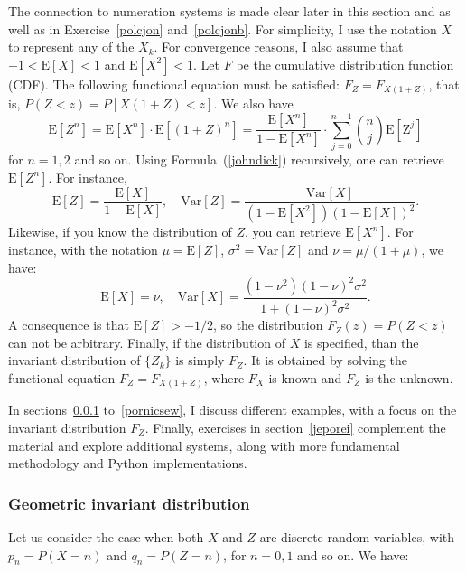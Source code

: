 \documentclass[oneside,10pt]{book}
\begin{document}
The connection to numeration systems is made clear later in this section and as well as in Exercise~\ref{polcjon} and~\ref{polcjonb}. For simplicity, I use the notation $X$ to represent any of the $X_k$. For convergence reasons, I also assume that $-1<\text{E}[X]< 1$ and $\text{E}[X^2]<1$.
Let $F$ be the cumulative distribution
 function (CDF).
The following \textcolor{index}{functional equation} must be satisfied:
$F_Z = F_{X(1+Z)}$, that is, $P(Z<z) = P[X(1+Z)<z]$. We also have
\begin{equation}
\text{E}[Z^n] =\text{E}[X^n]\cdot \text{E}[(1+Z)^n] = \frac{\text{E}[X^n]}{1-\text{E}[X^n]}
 \cdot\sum_{j=0}^{n-1} \binom{n}{j} \text{E}[\text{Z}^j] \label{johndick}
\end{equation}
 for $n=1,2$ and so on. Using Formula~(\ref{johndick}) recursively, one can retrieve
$\text{E}[Z^n]$. For instance,
$$
\text{E}[Z] = \frac{\text{E}[X]}{1-\text{E}[X]}, \quad \text{Var}[Z] = \frac{\text{Var}[X]}{(1-\text{E}[X^2])(1-\text{E}[X])^2}.
$$
Likewise, if you know the distribution of $Z$, you can retrieve $\text{E}[X^n]$. For instance,
with the notation $\mu=\text{E}[Z]$, $\sigma^2=\text{Var}[Z]$ and $\nu=\mu/(1+\mu)$, we have:
$$
\text{E}[X] = \nu, \quad \text{Var}[X] = \frac{(1-\nu^2)(1-\nu)^2 \sigma^2}{1 + (1-\nu)^2\sigma^2}.
$$
A consequence is that $\text{E}[Z]> -1/2$, so the distribution $F_Z(z) = P(Z<z)$ can not be arbitrary. Finally,
  if the distribution of $X$ is specified, than the \textcolor{index}{invariant distribution}
 of $\{Z_k\}$ is simply $F_Z$. It is obtained by solving the functional equation $F_Z = F_{X(1+Z)}$, where $F_X$ is known
  and $F_Z$ is the unknown.

In sections~\ref{geoger} to~\ref{pornicsew}, I discuss different examples, with a focus on the invariant distribution $F_Z$.
 Finally, exercises in section~\ref{jeporei} complement the material and explore additional systems, along with
 more fundamental methodology and Python implementations.

\subsubsection{Geometric invariant distribution}\label{geoger}

Let us consider the case when both $X$ and $Z$ are discrete random variables, with
$p_n=P(X = n)$ and $q_n = P(Z=n)$, for $n=0,1$ and so on. We have:\vspace{1ex}
\end{document}
